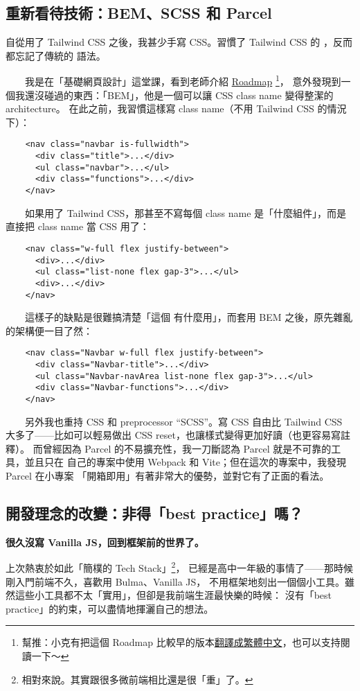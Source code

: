 \documentclass[12pt]{article}
\begin{document}
  \subsection{重新看待技術：BEM、SCSS 和 Parcel}
  自從用了 Tailwind CSS 之後，我甚少手寫 CSS。習慣了 Tailwind CSS 的
  ，反而都忘記了傳統的  語法。

  　　我是在「基礎網頁設計」這堂課，看到老師介紹 \href{https://roadmap.sh/frontend}{Roadmap}
  \footnote{幫推：小克有把這個 Roadmap 比較早的版本\href{https://github.com/goodjack/developer-roadmap-chinese}{翻譯成繁體中文}，也可以支持閱讀一下～}，
  意外發現到一個我還沒碰過的東西：「BEM」，他是一個可以讓 CSS class name 變得整潔的 architecture。
  在此之前，我習慣這樣寫 class name（不用 Tailwind CSS 的情況下）：

  \begin{verbatim}
    <nav class="navbar is-fullwidth">
      <div class="title">...</div>
      <ul class="navbar">...</ul>
      <div class="functions">...</div>
    </nav>
  \end{verbatim}

  　　如果用了 Tailwind CSS，那甚至不寫每個 class name 是「什麼組件」，而是
  直接把 class name 當 CSS 用了：

  \begin{verbatim}
    <nav class="w-full flex justify-between">
      <div>...</div>
      <ul class="list-none flex gap-3">...</ul>
      <div>...</div>
    </nav>
  \end{verbatim}

  　　這樣子的缺點是很難搞清楚「這個  有什麼用」，而套用 BEM
  之後，原先雜亂的架構便一目了然：

  \begin{verbatim}
    <nav class="Navbar w-full flex justify-between">
      <div class="Navbar-title">...</div>
      <ul class="Navbar-navArea list-none flex gap-3">...</ul>
      <div class="Navbar-functions">...</div>
    </nav>
  \end{verbatim}

  　　另外我也重持 CSS 和 preprocessor “SCSS”。寫 CSS 自由比 Tailwind CSS
  大多了——比如可以輕易做出 CSS reset，也讓樣式變得更加好讀（也更容易寫註釋）。
  而曾經因為 Parcel 的不易擴充性，我一刀斷認為 Parcel 就是不可靠的工具，並且只在
  自己的專案中使用 Webpack 和 Vite；但在這次的專案中，我發現 Parcel 在小專案
  「開箱即用」有著非常大的優勢，並對它有了正面的看法。

  \subsection{開發理念的改變：非得「best practice」嗎？}
  \begin{center}
    \textbf{很久沒寫 Vanilla JS，回到框架前的世界了。}
  \end{center}
  上次熱衷於如此「簡樸的 Tech Stack」\footnote{相對來說。其實跟很多微前端相比還是很「重」了。}，
  已經是高中一年級的事情了——那時候剛入門前端不久，喜歡用 Bulma、Vanilla JS，
  不用框架地刻出一個個小工具。雖然這些小工具都不太「實用」，但卻是我前端生涯最快樂的時候：
  沒有「best practice」的約束，可以盡情地揮灑自己的想法。
\end{document}
